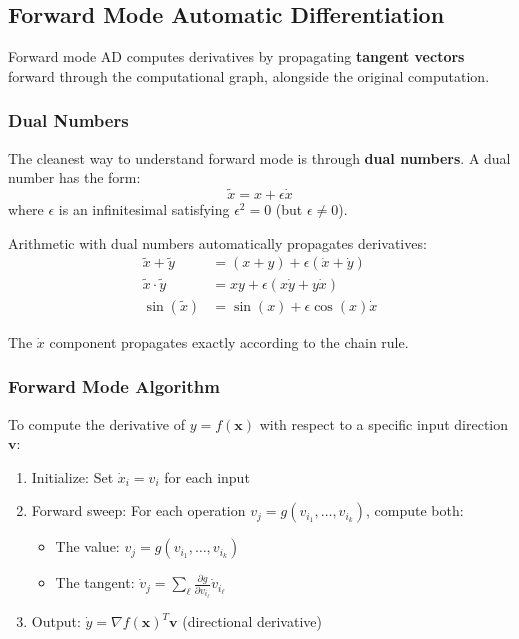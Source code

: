 \subsection{Forward Mode Automatic Differentiation}

Forward mode AD computes derivatives by propagating \textbf{tangent vectors} forward through the computational graph, alongside the original computation.

\subsubsection{Dual Numbers}

The cleanest way to understand forward mode is through \textbf{dual numbers}. A dual number has the form:
\begin{equation}
\tilde{x} = x + \epsilon \dot{x}
\end{equation}
where $\epsilon$ is an infinitesimal satisfying $\epsilon^2 = 0$ (but $\epsilon \neq 0$).

Arithmetic with dual numbers automatically propagates derivatives:
\begin{align}
\tilde{x} + \tilde{y} &= (x + y) + \epsilon(\dot{x} + \dot{y}) \\
\tilde{x} \cdot \tilde{y} &= xy + \epsilon(x\dot{y} + y\dot{x}) \\
\sin(\tilde{x}) &= \sin(x) + \epsilon \cos(x) \dot{x}
\end{align}

The $\dot{x}$ component propagates exactly according to the chain rule.

\subsubsection{Forward Mode Algorithm}

To compute the derivative of $y = f(\mathbf{x})$ with respect to a specific input direction $\mathbf{v}$:

\begin{enumerate}
    \item Initialize: Set $\dot{x}_i = v_i$ for each input
    \item Forward sweep: For each operation $v_j = g(v_{i_1}, \ldots, v_{i_k})$, compute both:
    \begin{itemize}
        \item The value: $v_j = g(v_{i_1}, \ldots, v_{i_k})$
        \item The tangent: $\dot{v}_j = \sum_{\ell} \frac{\partial g}{\partial v_{i_\ell}} \dot{v}_{i_\ell}$
    \end{itemize}
    \item Output: $\dot{y} = \nabla f(\mathbf{x})^T \mathbf{v}$ (directional derivative)
\end{enumerate}

